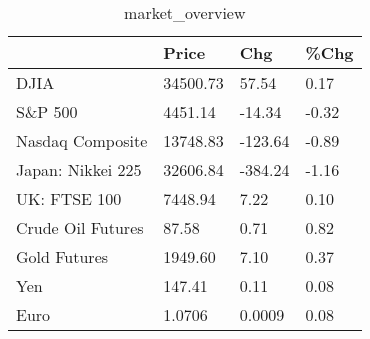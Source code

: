 \documentclass{article}%
\begin{document}
%


\begin{table}[htbp]%
\caption{market\_overview}%
\centering%
\begin{adjustbox}{width=1\textwidth}%
\begin{tabular}{llll}
\toprule
                  &    Price &     Chg &  \%Chg \\
\midrule
             DJIA & 34500.73 &   57.54 &  0.17 \\
          S\&P 500 &  4451.14 &  -14.34 & -0.32 \\
 Nasdaq Composite & 13748.83 & -123.64 & -0.89 \\
Japan: Nikkei 225 & 32606.84 & -384.24 & -1.16 \\
     UK: FTSE 100 &  7448.94 &    7.22 &  0.10 \\
Crude Oil Futures &    87.58 &    0.71 &  0.82 \\
     Gold Futures &  1949.60 &    7.10 &  0.37 \\
              Yen &   147.41 &    0.11 &  0.08 \\
             Euro &   1.0706 &  0.0009 &  0.08 \\
\bottomrule
\end{tabular}
%
\end{adjustbox}%
\end{table}

%
\end{document}
